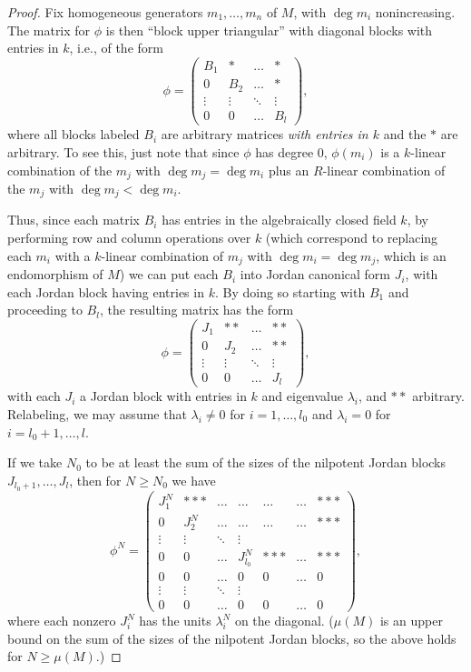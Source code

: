 \documentclass[12pt]{article}
\let\l\lambda
\theoremstyle{theorem}
\numberwithin{thm}{section}
\theoremstyle{definition}
\begin{document}
\begin{proof}
Fix homogeneous generators $m_1,\dots,m_n$ of $M$, with $\deg m_i$ nonincreasing.
The matrix for $\phi$ is then ``block upper triangular'' with diagonal blocks with entries in $k$, i.e., of the form
$$
\phi=
\begin{pmatrix}
  B_1 & * & \dots& * \\
  0 & B_2 & \dots &* \\
\vdots &\vdots & \ddots &\vdots \\
0 & 0 & \dots &B_l
\end{pmatrix},
$$
where all blocks labeled $B_i$ are arbitrary matrices \emph{with entries in $k$} and the $*$ are arbitrary.
To see this, just note that since $\phi$ has degree 0, $\phi(m_i)$ is a $k$-linear combination of the $m_j$ with $\deg m_j=\deg m_i$ plus an $R$-linear combination of the $m_j$ with $\deg m_j<\deg m_i$.

Thus, since each matrix $B_i$ has entries in the algebraically closed field $k$, by performing row and column operations over $k$ (which correspond to replacing each $m_i$ with a $k$-linear combination of $m_j$ with $\deg m_i = \deg m_j$, which is an endomorphism of $M$) we can put each $B_i$ into Jordan canonical form $J_i$, with each Jordan block having entries in $k$. By doing so starting with $B_1$ and proceeding to $B_l$, the resulting matrix has the form
\begin{equation}
\label{eq:Jordan}
\phi
=
\begin{pmatrix}
  J_1 & ** & \dots& ** \\
  0 & J_2 & \dots &** \\
\vdots &\vdots & \ddots &\vdots \\
0 & 0 & \dots & J_l
\end{pmatrix},
\end{equation}
with each $J_i$ a Jordan block with entries in $k$ and eigenvalue $\l_i$, and $**$ arbitrary.
Relabeling, we may assume that $\l_i\neq 0$ for $i=1,\dots,l_0$ and $\l_i=0$ for $i=l_0+1,\dots,l$.

If we take $N_0  $ to be at least the sum of the sizes of the nilpotent Jordan blocks $J_{l_0+1},\dots,J_l$, then for $N\geq N_0$ we have
$$
\phi^N =
\begin{pmatrix}
  J_1^N & *** &\dots & \dots& \dots  &\dots & *** \\
  0 & J_2^N & \dots &\dots&\dots & \dots& *** \\
\vdots &\vdots & \ddots &\vdots \\
0 & 0 & \dots & J_{l_0}^N & *** & \dots & ***\\
0 & 0 & \dots & 0 & 0 & \dots & 0\\
\vdots &\vdots & \ddots &\vdots \\
0 & 0 & \dots & 0 & 0 & \dots & 0
\end{pmatrix},
$$
where each nonzero $J_i^N$ has the units $\l_i^N$ on the diagonal.
($\mu(M)$ is an upper bound on the sum of the sizes of the nilpotent Jordan blocks, so the above holds for $N\geq \mu(M)$.)


\end{proof}
\end{document}
